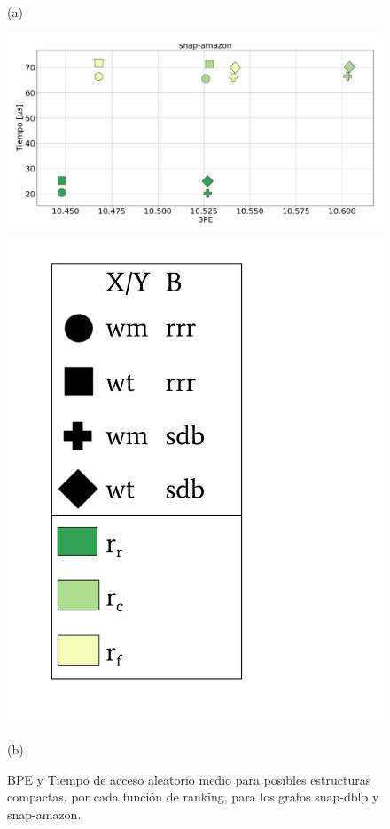 \begin{figure}
\begin{minipage}{1\textwidth}
    			(a)		
    	\end{minipage}
    	
       	\begin{minipage}{1\textwidth}
    			\centering
    			\begin{minipage}{0.8\textwidth}
    				\centering
    				\includegraphics[width=1\linewidth]{img/sdsl/aleatorioBig/snap-amazon.pdf}
    			\end{minipage}
    			\begin{minipage}{0.15\textwidth}
    				\centering
    				\includegraphics[scale=.22, clip, trim=70 0 0 0]{img/sdsl/label.pdf}
    			\end{minipage}
    			
    			(b)		
    	\end{minipage}
    	
    \caption{BPE y Tiempo de acceso aleatorio medio para posibles estructuras compactas, por cada función de ranking, para los grafos snap-dblp y snap-amazon.}
    \label{fig:sdslBPEAle4}
\end{figure}
